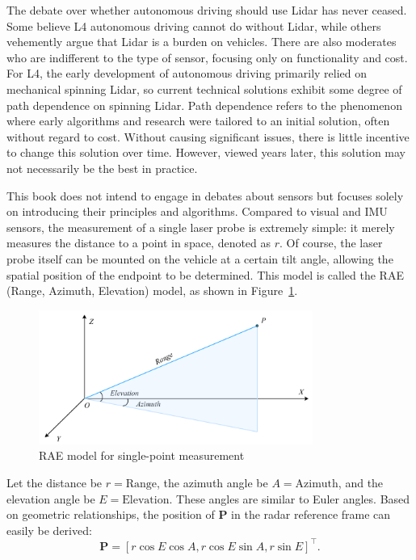 The debate over whether autonomous driving should use Lidar has never ceased. Some believe L4 autonomous driving cannot do without Lidar, while others vehemently argue that Lidar is a burden on vehicles. There are also moderates who are indifferent to the type of sensor, focusing only on functionality and cost. For L4, the early development of autonomous driving primarily relied on mechanical spinning Lidar, so current technical solutions exhibit some degree of path dependence on spinning Lidar. Path dependence refers to the phenomenon where early algorithms and research were tailored to an initial solution, often without regard to cost. Without causing significant issues, there is little incentive to change this solution over time. However, viewed years later, this solution may not necessarily be the best in practice.  

This book does not intend to engage in debates about sensors but focuses solely on introducing their principles and algorithms. Compared to visual and IMU sensors, the measurement of a single laser probe is extremely simple: it merely measures the distance to a point in space, denoted as $r$. Of course, the laser probe itself can be mounted on the vehicle at a certain tilt angle, allowing the spatial position of the endpoint to be determined. This model is called the RAE (Range, Azimuth, Elevation) model, as shown in Figure~\ref{fig:RAE}.  

\begin{figure}[!htp]  
	\centering  
	\includegraphics[width=0.8\textwidth]{resources/basic-point-cloud/RAE.pdf}  
	\caption{RAE model for single-point measurement}  
	\label{fig:RAE}  
\end{figure}  

Let the distance be $r=\text{Range}$, the azimuth angle be $A=\text{Azimuth}$, and the elevation angle be $E=\text{Elevation}$. These angles are similar to Euler angles. Based on geometric relationships, the position of $\bm{P}$ in the radar reference frame can easily be derived:  
\begin{equation}\label{key}  
	\bm{P} = \left[r \cos E \cos A, r \cos E \sin A, r \sin E \right] ^\top.  
\end{equation}  

